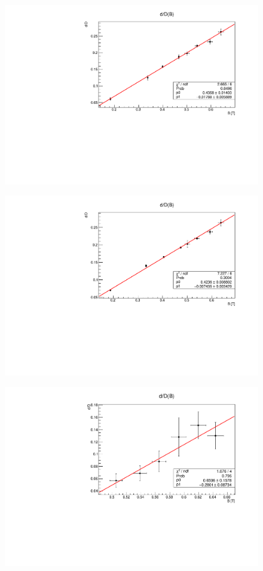 \documentclass[a4paper,12pt,abstracton]{scrartcl}
\begin{document}
\begin{figure}[H]
    \centering
    \includegraphics[scale=0.6]{plots/znt.pdf}
    \caption{}
    \label{fig:znt}
\end{figure}

\begin{figure}[H]
    \centering
    \includegraphics[scale=0.6]{plots/znl.pdf}
    \caption{}
    \label{fig:znl}
\end{figure}

\begin{figure}[H]
    \centering
    \includegraphics[scale=0.6]{plots/zal.pdf}
    \caption{}
    \label{fig:zal}
\end{figure}
\end{document}
